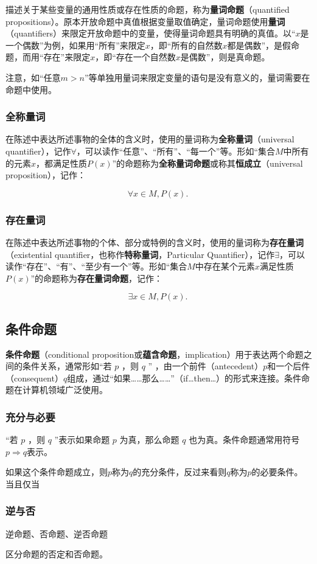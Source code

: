 描述关于某些变量的通用性质或存在性质的命题，称为\textbf{量词命题}（quantified propositions）。原本开放命题中真值根据变量取值确定，量词命题使用\textbf{量词}（quantifiers）来限定开放命题中的变量，使得量词命题具有明确的真值。以“$x$是一个偶数”为例，如果用“所有”来限定$x$，即“所有的自然数$x$都是偶数”，是假命题，而用“存在”来限定$x$，即“存在一个自然数$x$是偶数”，则是真命题。

注意，如“任意$m>n$”等单独用量词来限定变量的语句是没有意义的，量词需要在命题中使用。

\subsubsection{全称量词}

在陈述中表达所述事物的全体的含义时，使用的量词称为\textbf{全称量词}（universal quantifier），记作$\forall$，可以读作“任意”、“所有”、“每一个”等。形如“集合$M$中所有的元素$x$，都满足性质$P(x)$”的命题称为\textbf{全称量词命题}或称其\textbf{恒成立}（universal proposition），记作：


\begin{equation}
\forall x\in M,P(x).~
\end{equation}

\subsubsection{存在量词}

在陈述中表达所述事物的个体、部分或特例的含义时，使用的量词称为\textbf{存在量词}（existential quantifier，也称作\textbf{特称量词}，Particular Quantifier），记作$\exists$，可以读作“存在”、“有”、“至少有一个”等。形如“集合$M$中存在某个元素$x$满足性质$P(x)$”的命题称为\textbf{存在量词命题}，记作：

\begin{equation}
\exists x\in M,P(x).~
\end{equation}

\subsection{条件命题}

\textbf{条件命题}（conditional proposition或\textbf{蕴含命题}，implication）用于表达两个命题之间的条件关系，通常形如“若 $p$ ，则 $q$ ” ，由一个前件（antecedent）$p$和一个后件（consequent）$q$组成，通过“如果……那么……”（if…then…）的形式来连接。条件命题在计算机领域广泛使用。

\subsubsection{充分与必要}

“若 $p$ ，则 $q$ ”表示如果命题 $p$ 为真，那么命题 $q$ 也为真。条件命题通常用符号$p\Rightarrow q$表示。

如果这个条件命题成立，则$p$称为$q$的充分条件，反过来看则$q$称为$p$的必要条件。
当且仅当


\subsubsection{逆与否}

逆命题、否命题、逆否命题

区分命题的否定和否命题。
